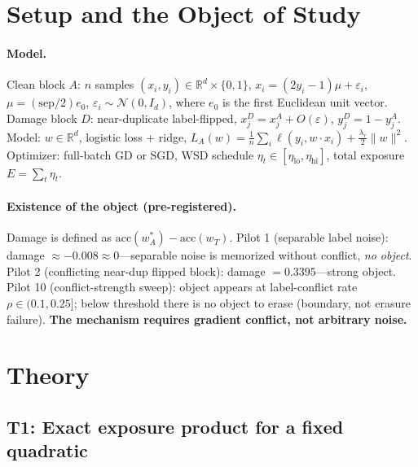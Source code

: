 \documentclass{article}
\newcommand{\Expo}{E}         %
\begin{document}
\section{Setup and the Object of Study}
\label{sec:object}

\paragraph{Model.} Clean block $A$: $n$ samples $(x_i,y_i)\in\mathbb{R}^d\times\{0,1\}$,
$x_i=(2y_i-1)\mu+\varepsilon_i$, $\mu=(\mathrm{sep}/2)e_0$, $\varepsilon_i\sim\mathcal{N}(0,I_d)$,
where $e_0$ is the first Euclidean unit vector.
Damage block $D$: near-duplicate label-flipped, $x_j^D=x_j^A+O(\varepsilon)$,
$y_j^D=1-y_j^A$. Model: $w\in\mathbb{R}^d$, logistic loss + ridge,
$L_A(w)=\frac1n\sum_i \ell(y_i,w\!\cdot\!x_i)+\frac{\lambda_r}{2}\|w\|^2$.
Optimizer: full-batch GD or SGD, WSD schedule $\eta_t\in[\eta_{\mathrm{lo}},\eta_{\mathrm{hi}}]$,
total exposure $\Expo=\sum_t\eta_t$.

\paragraph{Existence of the object (pre-registered).} Damage is defined as
$\mathrm{acc}(w^*_A)-\mathrm{acc}(w_T)$. Pilot 1 (separable label noise): damage $\approx-0.008\approx0$---separable noise is memorized without conflict, \emph{no object}. Pilot 2 (conflicting
near-dup flipped block): damage $=0.3395$---strong object. Pilot 10 (conflict-strength sweep):
object appears at label-conflict rate $\rho\in(0.1,0.25]$; below threshold there is no object
to erase (boundary, not erasure failure). \textbf{The mechanism requires gradient conflict, not
arbitrary noise.}

\section{Theory}
\label{sec:theory}

\subsection{T1: Exact exposure product for a fixed quadratic}
\label{sec:t1}
\end{document}
